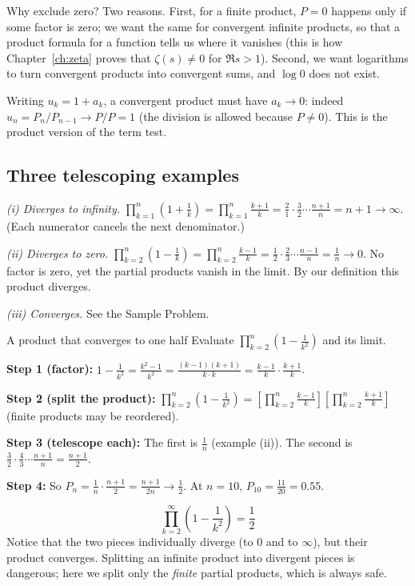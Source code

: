 Why exclude zero? Two reasons. First, for a finite product, $P=0$ happens only if some factor is zero; we want the same for convergent infinite products, so that a product formula for a function tells us where it vanishes (this is how Chapter~\ref{ch:zeta} proves that $\zeta(s)\ne0$ for $\Re s>1$). Second, we want logarithms to turn convergent products into convergent sums, and $\log 0$ does not exist.

Writing $u_k=1+a_k$, a convergent product must have $a_k\to0$: indeed $u_n=P_n/P_{n-1}\to P/P=1$ (the division is allowed because $P\ne0$). This is the product version of the term test.

\subsection{Three telescoping examples}

\emph{(i) Diverges to infinity.} $\prod_{k=1}^n\left(1+\frac1k\right)=\prod_{k=1}^n\frac{k+1}{k}=\frac21\cdot\frac32\cdots\frac{n+1}{n}=n+1\to\infty$. (Each numerator cancels the next denominator.)

\emph{(ii) Diverges to zero.} $\prod_{k=2}^n\left(1-\frac1k\right)=\prod_{k=2}^n\frac{k-1}k=\frac12\cdot\frac23\cdots\frac{n-1}n=\frac1n\to0$. No factor is zero, yet the partial products vanish in the limit. By our definition this product diverges.

\emph{(iii) Converges.} See the Sample Problem.

\begin{sample}{A product that converges to one half}
Evaluate $\prod_{k=2}^n\left(1-\frac1{k^2}\right)$ and its limit.

\textbf{Step 1 (factor):} $1-\frac1{k^2}=\frac{k^2-1}{k^2}=\frac{(k-1)(k+1)}{k\cdot k}=\frac{k-1}k\cdot\frac{k+1}k$.

\textbf{Step 2 (split the product):} $\prod_{k=2}^n\left(1-\frac1{k^2}\right)=\left[\prod_{k=2}^n\frac{k-1}k\right]\left[\prod_{k=2}^n\frac{k+1}k\right]$ (finite products may be reordered).

\textbf{Step 3 (telescope each):} The first is $\frac1n$ (example (ii)). The second is $\frac32\cdot\frac43\cdots\frac{n+1}n=\frac{n+1}2$.

\textbf{Step 4:} So $P_n=\frac1n\cdot\frac{n+1}2=\frac{n+1}{2n}\to\frac12$. At $n=10$, $P_{10}=\frac{11}{20}=0.55$.

\[\boxed{\prod_{k=2}^\infty\left(1-\frac1{k^2}\right)=\frac12}\]
Notice that the two pieces individually diverge (to $0$ and to $\infty$), but their product converges. Splitting an infinite product into divergent pieces is dangerous; here we split only the \emph{finite} partial products, which is always safe.
\end{sample}

